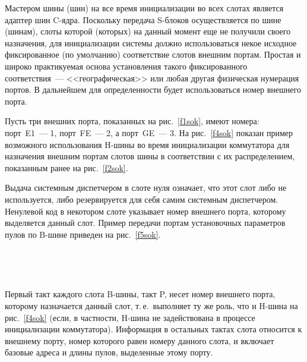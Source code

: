 \begin{multicols}{2}
    Мастером шины (шин) на все время инициализации во всех слотах является адаптер шин
C-ядра. Поскольку передача S-блоков осуществляется по шине (шинам), слоты которой
(которых) на данный момент еще не получили своего назначения, для инициализации системы
должно использоваться некое исходное фиксированное (по умолчанию) соответствие слотов
внешним портам. Простая и широко практикуемая основа установления такого фиксированного
соответствия~--- <<географическая>> или любая другая физическая нумерация портов. В
дальнейшем для определенности будет использоваться номер внешнего порта.

    Пусть три внешних порта, показанных на рис.~\ref{f1sok}, имеют номера: порт~E1~--- 1,
порт~FE~--- 2, а порт~GE~--- 3. На рис.~\ref{f4sok} показан пример возможного использования
H-шины во время инициализации коммутатора для назначения внешним портам слотов шины в
соответствии с их распределением, показанным ранее на рис.~\ref{f2sok}.

    Выдача системным диспетчером в слоте нуля означает, что этот слот либо не используется,
либо резервируется для себя самим системным диспетчером. Ненулевой код в некотором слоте
указывает номер внешнего порта, которому выделяется данный слот. Пример передачи портам
установочных параметров пулов по B-шине приведен на рис.~\ref{f5sok}.

\begin{figure*} %
\vspace*{1pt}
\begin{center}
\mbox{%
\epsfxsize=159.819mm
}
\end{center}
\vspace*{-9pt}
\vspace*{6pt}
\end{figure*}
\begin{figure*} %
\vspace*{1pt}
\begin{center}
\mbox{%
\epsfxsize=166.218mm
}
\end{center}
\vspace*{-9pt}
    \end{figure*}

    Первый такт каждого слота B-шины, такт P, несет номер внешнего порта, которому
назначается данный слот, т.\,е.\ выполняет ту же роль, что и H-шина на рис.~\ref{f4sok} (если, в
частности, H-шина не задействована в процессе инициализации коммутатора). Информация в
остальных тактах слота относится к внешнему порту, номер которого равен номеру данного
слота, и включает базовые адреса и длины пулов, выделенные этому порту.


\end{multicols}
